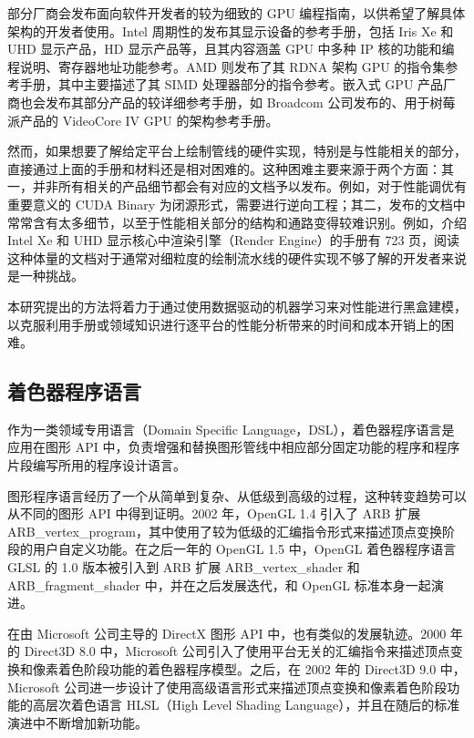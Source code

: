 部分厂商会发布面向软件开发者的较为细致的 GPU 编程指南，以供希望了解具体架构的开发者使用。Intel 周期性的发布其显示设备的参考手册，包括 Iris Xe 和 UHD 显示产品，HD 显示产品等\cite{IntelGPUManual}，且其内容涵盖 GPU 中多种 IP 核的功能和编程说明、寄存器地址功能参考。AMD 则发布了其 RDNA 架构 GPU 的指令集参考手册\cite{AMDRDNAISA}，其中主要描述了其 SIMD 处理器部分的指令参考。嵌入式 GPU 产品厂商也会发布其部分产品的较详细参考手册，如 Broadcom 公司发布的、用于树莓派产品的 VideoCore IV GPU 的架构参考手册\cite{V3DManual}。

然而，如果想要了解给定平台上绘制管线的硬件实现，特别是与性能相关的部分，直接通过上面的手册和材料还是相对困难的。这种困难主要来源于两个方面：其一，并非所有相关的产品细节都会有对应的文档予以发布。例如，对于性能调优有重要意义的 CUDA Binary 为闭源形式，需要进行逆向工程\cite{DecodingCUDABinary}；其二，发布的文档中常常含有太多细节，以至于性能相关部分的结构和通路变得较难识别。例如，介绍 Intel Xe 和 UHD 显示核心中渲染引擎（Render Engine）的手册有 723 页，阅读这种体量的文档对于通常对细粒度的绘制流水线的硬件实现不够了解的开发者来说是一种挑战。

本研究提出的方法将着力于通过使用数据驱动的机器学习来对性能进行黑盒建模，以克服利用手册或领域知识进行逐平台的性能分析带来的时间和成本开销上的困难。

\subsection{着色器程序语言}

作为一类领域专用语言（Domain Specific Language，DSL），着色器程序语言是应用在图形 API 中，负责增强和替换图形管线中相应部分固定功能的程序和程序片段编写所用的程序设计语言。


图形程序语言经历了一个从简单到复杂、从低级到高级的过程，这种转变趋势可以从不同的图形 API 中得到证明。2002 年，OpenGL 1.4 引入了 ARB 扩展 ARB\_vertex\_program，其中使用了较为低级的汇编指令形式来描述顶点变换阶段的用户自定义功能。在之后一年的 OpenGL 1.5 中，OpenGL 着色器程序语言 GLSL 的 1.0 版本被引入到 ARB 扩展 ARB\_vertex\_shader 和 ARB\_fragment\_shader 中，并在之后发展迭代，和 OpenGL 标准本身一起演进。

在由 Microsoft 公司主导的 DirectX 图形 API 中，也有类似的发展轨迹。2000 年的 Direct3D 8.0 中，Microsoft 公司引入了使用平台无关的汇编指令来描述顶点变换和像素着色阶段功能的着色器程序模型。之后，在 2002 年的 Direct3D 9.0 中，Microsoft 公司进一步设计了使用高级语言形式来描述顶点变换和像素着色阶段功能的高层次着色语言 HLSL（High Level Shading Language），并且在随后的标准演进中不断增加新功能。

